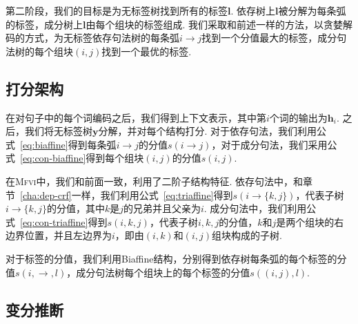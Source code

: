 第二阶段，我们的目标是为无标签树找到所有的标签$\boldsymbol{l}$.
依存树上$\boldsymbol{l}$被分解为每条弧的标签，成分树上$\boldsymbol{l}$由每个组块的标签组成.
我们采取和前述一样的方法，以贪婪解码的方式，为无标签依存句法树的每条弧$i\rightarrow j$找到一个分值最大的标签，成分句法树的每个组块$(i,j)$找到一个最优的标签.

\subsection{打分架构}

在对句子中的每个词编码之后，我们得到上下文表示，其中第$i$个词的输出为$\mathbf{h}_i$.
之后，我们将无标签树$\boldsymbol{y}$分解，并对每个结构打分.
对于依存句法，我们利用公式~\ref{eq:biaffine}得到每条弧$i\rightarrow j$的分值$s(i\rightarrow j)$，对于成分句法，我们采用公式~\ref{eq:con-biaffine}得到每个组块$(i, j)$的分值$s(i, j)$.

在\textsc{Mfvi}中，我们和前面一致，利用了二阶子结构特征.
依存句法中，和章节~\ref{cha:dep-crf}一样，我们利用公式~\ref{eq:triaffine}得到$s(i\rightarrow\{k,j\})$，代表子树$i\rightarrow \{k,j\}$的分值，其中$k$是$j$的兄弟并且父亲为$i$.
成分句法中，我们利用公式~\ref{eq:con-triaffine}得到$s(i,k,j)$，代表子树$i,k,j$的分值，$k$和$j$是两个组块的右边界位置，并且左边界为$i$，即由$(i,k)$和$(i,j)$组块构成的子树.

对于标签的分值，我们利用Biaffine结构，分别得到依存树每条弧的每个标签的分值$s(i,\rightarrow,l)$，成分句法树每个组块上的每个标签的分值$s((i,j),l)$.

\subsection{变分推断}


